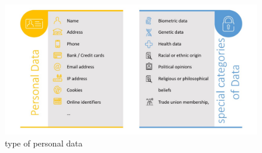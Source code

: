 \begin{figure}[h]
    \centering
    \includegraphics[width=12cm]{Images/personal data.jpg}
    \caption{type of personal data}
\end{figure}

